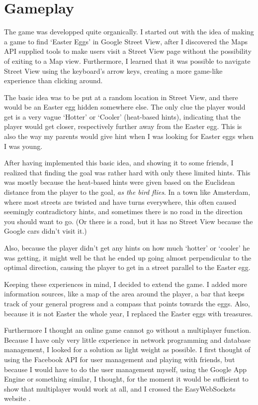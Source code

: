 \documentclass[a4paper,10pt]{article}
\begin{document}
\section{Gameplay} %
\label{sec:gameplay}
The game was developped quite organically. I started out with the idea of making a game to find `Easter Eggs' in Google Street View, after I discovered the Maps API supplied tools to make users visit a Street View page without the possibility of exiting to a Map view. Furthermore, I learned that it was possible to navigate Street View using the keyboard's arrow keys, creating a more game-like experience than clicking around.

The basic idea was to be put at a random location in Street View, and there would be an Easter egg hidden somewhere else. The only clue the player would get is a very vague `Hotter' or `Cooler' (heat-based hints), indicating that the player would get closer, respectively further away from the Easter egg. This is also the way my parents would give hint when I was looking for Easter eggs when I was young.

After having implemented this basic idea, and showing it to some friends, I realized that finding the goal was rather hard with only these limited hints. This was mostly because the heat-based hints were given based on the Euclidean distance from the player to the goal, \emph{as the bird flies}. In a town like Amsterdam, where most streets are twisted and have turns everywhere, this often caused seemingly contradictory hints, and sometimes there is no road in the direction you should want to go. (Or there is a road, but it has no Street View because the Google cars didn't visit it.)

Also, because the player didn't get any hints on how much `hotter' or `cooler' he was getting, it might well be that he ended up going almost perpendicular to the optimal direction, causing the player to get in a street parallel to the Easter egg.

Keeping these experiences in mind, I decided to extend the game. I added more information sources, like a map of the area around the player, a bar that keeps track of your general progress and a compass that points towards the eggs. Also, because it is not Easter the whole year, I replaced the Easter eggs with treasures.

Furthermore I thought an online game cannot go without a multiplayer function. Because I have only very little experience in network programming and database management, I looked for a solution as light weight as possible. I first thought of using the Facebook API for user management and playing with friends, but because I would have to do the user management myself, using the Google App Engine or something similar, I thought, for the moment it would be sufficient to show that multiplayer would work at all, and I crossed the EasyWebSockets website \cite{}.
\end{document}
